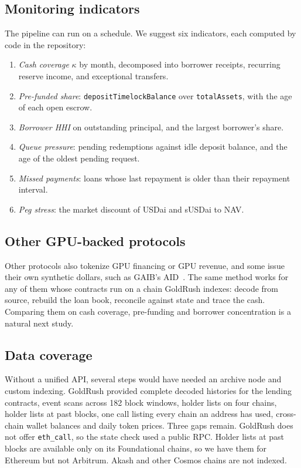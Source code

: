 \subsection{Monitoring indicators}
The pipeline can run on a schedule. We suggest six indicators, each computed by code in the repository:
\begin{enumerate}
\item \emph{Cash coverage} $\kappa$ by month, decomposed into borrower receipts, recurring reserve income, and exceptional transfers.
\item \emph{Pre-funded share}: \texttt{depositTimelockBalance} over \texttt{totalAssets}, with the age of each open escrow.
\item \emph{Borrower HHI} on outstanding principal, and the largest borrower's share.
\item \emph{Queue pressure}: pending redemptions against idle deposit balance, and the age of the oldest pending request.
\item \emph{Missed payments}: loans whose last repayment is older than their repayment interval.
\item \emph{Peg stress}: the market discount of USDai and sUSDai to NAV.
\end{enumerate}

\subsection{Other GPU-backed protocols}
Other protocols also tokenize GPU financing or GPU revenue, and some issue their own synthetic dollars, such as GAIB's AID~\cite{gaib2025}. The same method works for any of them whose contracts run on a chain GoldRush indexes: decode from source, rebuild the loan book, reconcile against state and trace the cash. Comparing them on cash coverage, pre-funding and borrower concentration is a natural next study.

\subsection{Data coverage}
Without a unified API, several steps would have needed an archive node and custom indexing. GoldRush provided complete decoded histories for the lending contracts, event scans across 182 block windows, holder lists on four chains, holder lists at past blocks, one call listing every chain an address has used, cross-chain wallet balances and daily token prices. Three gaps remain. GoldRush does not offer \texttt{eth\_call}, so the state check used a public RPC. Holder lists at past blocks are available only on its Foundational chains, so we have them for Ethereum but not Arbitrum. Akash and other Cosmos chains are not indexed.

